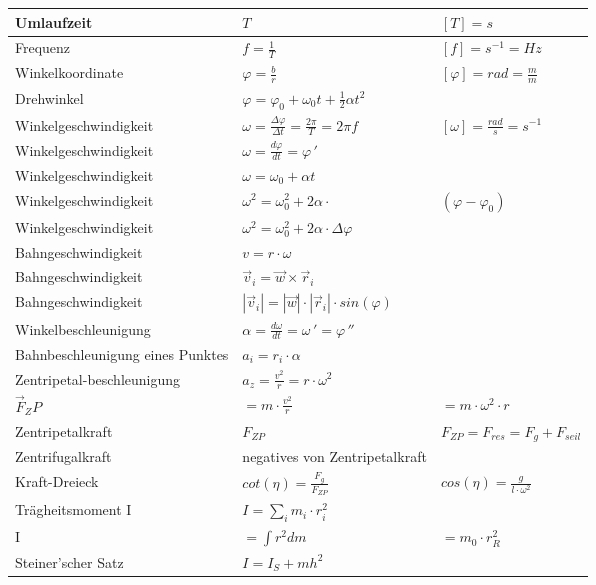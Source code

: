 \begin{tabularx}{\columnwidth}{@{}XXX@{}}
	Umlaufzeit & $T$ & $[T] = s$ \\ \hline
	Frequenz & $f=\frac{1}{T}$ & $[f] = s^{-1} = Hz$ \\ \hline
	Winkelkoordinate & $\varphi = \frac{b}{r}$ & $[\varphi] = rad = \frac{m}{m}$ \\ \hline
	Drehwinkel & $\varphi = \varphi_0 + \omega_0 t + \frac{1}{2}\alpha t^2$ \\ \hline
	Winkelgeschwindigkeit & $\omega = \frac{\Delta \varphi}{\Delta t} = \frac{2\pi}{T} = 2\pi f$ & $[\omega] = \frac{rad}{s} = s^{-1}$ \\ \hline
	Winkelgeschwindigkeit & $\omega = \frac{d\varphi}{dt} = \varphi\,'$ \\ \hline
	Winkelgeschwindigkeit & $\omega = \omega_0 + \alpha t$ \\ \hline
	Winkelgeschwindigkeit & $\omega^2 = \omega_0^2 + 2\alpha\cdot $ & $\left(\varphi-\varphi_{0}\right)$ \\ \hline
	Winkelgeschwindigkeit & $\omega^2 = \omega_0^2 + 2\alpha\cdot\Delta \varphi$ \\ \hline
	Bahngeschwindigkeit & $v = r\cdot \omega$ \\ \hline
	Bahngeschwindigkeit & $\vec{v}_i = \vec{w} \times \vec{r}_i$ \\ \hline
	Bahngeschwindigkeit & $|\vec{v}_i| = |\vec{w}| \cdot |\vec{r}_i| \cdot sin(\varphi)$ \\ \hline
	Winkelbeschleunigung & $ \alpha = \frac{d\omega}{dt} = \omega\,' = \varphi\,''$ \\ \hline
	Bahnbeschleunigung eines Punktes & $a_i = r_i\cdot \alpha$ \\ \hline
	Zentripetal-beschleunigung & $a_z = \frac{v^2}{r} = r\cdot \omega^2$ \\ \hline
	$\vec{F}_ZP$ & $= m\cdot \frac{v^2}{r}$ & $= m\cdot \omega^2\cdot r$ \\ \hline
	Zentripetalkraft & $F_{ZP}$ & $F_{ZP} = F_{res} = F_g + F_{seil}$ \\\hline
	Zentrifugalkraft & negatives von Zentripetalkraft \\ \hline
	Kraft-Dreieck & $cot(\eta) = \frac{F_g}{F_{ZP}}$ & $cos(\eta) = \frac{g}{l\cdot\omega^2}$ \\ \hline
	Trägheitsmoment I & $I = \sum_{i} m_i\cdot r_i^2$ \\ \hline  
	I & $= \int r^2dm$ & $= m_0\cdot r_R^2$ \\ \hline
	Steiner'scher Satz & $I = I_S + mh^2$ \\ \hline

\end{tabularx}
